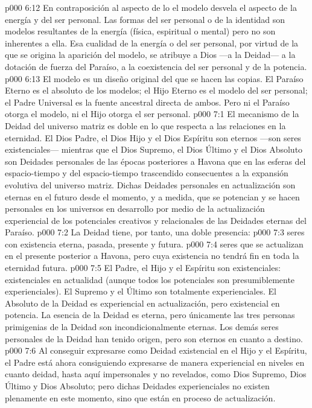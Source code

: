 \vs p000 6:12 En contraposición al aspecto de lo  el modelo desvela el aspecto  de la energía y del ser personal. Las formas del ser personal o de la identidad son modelos resultantes de la energía (física, espiritual o mental) pero no son inherentes a ella. Esa cualidad de la energía o del ser personal, por virtud de la que se origina la aparición del modelo, se atribuye a Dios ---a la Deidad--- a la dotación de fuerza del Paraíso, a la coexistencia del ser personal y de la potencia.
\vs p000 6:13 El modelo es un diseño original del que se hacen las copias. El Paraíso Eterno es el absoluto de los modelos; el Hijo Eterno es el modelo del ser personal; el Padre Universal es la fuente ancestral directa de ambos. Pero ni el Paraíso otorga el modelo, ni el Hijo otorga el ser personal.
\vs p000 7:1 El mecanismo de la Deidad del universo matriz es doble en lo que respecta a las relaciones en la eternidad. El Dios Padre, el Dios Hijo y el Dios Espíritu son eternos ---son seres existenciales--- mientras que el Dios Supremo, el Dios Último y el Dios Absoluto son Deidades personales de las épocas posteriores a Havona que  en las esferas del espacio\hyp{}tiempo y del espacio\hyp{}tiempo trascendido consecuentes a la expansión evolutiva del universo matriz. Dichas Deidades personales en actualización son eternas en el futuro desde el momento, y a medida, que se potencian y se hacen personales en los universos en desarrollo por medio de la actualización experiencial de los potenciales creativos y relacionales de las Deidades eternas del Paraíso.
\vs p000 7:2 La Deidad tiene, por tanto, una doble presencia:
\vs p000 7:3  seres con existencia eterna, pasada, presente y futura.
\vs p000 7:4  seres que se actualizan en el presente posterior a Havona, pero cuya existencia no tendrá fin en toda la eternidad futura.
\vs p000 7:5 \pc El Padre, el Hijo y el Espíritu son existenciales: existenciales en actualidad (aunque todos los potenciales son presumiblemente experienciales). El Supremo y el Último son totalmente experienciales. El Absoluto de la Deidad es experiencial en actualización, pero existencial en potencia. La esencia de la Deidad es eterna, pero únicamente las tres personas primigenias de la Deidad son incondicionalmente eternas. Los demás seres personales de la Deidad han tenido origen, pero son eternos en cuanto a destino.
\vs p000 7:6 Al conseguir expresarse como Deidad existencial en el Hijo y el Espíritu, el Padre está ahora consiguiendo expresarse de manera experiencial en niveles en cuanto deidad, hasta aquí impersonales y no revelados, como Dios Supremo, Dios Último y Dios Absoluto; pero dichas Deidades experienciales no existen plenamente en este momento, sino que están en proceso de actualización.
